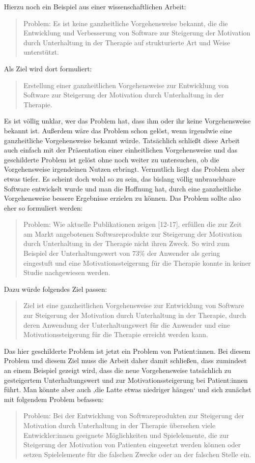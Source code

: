 Hierzu noch ein Beispiel aus einer wissenschaftlichen Arbeit:
\blockquote{Problem: Es ist keine ganzheitliche Vorgehensweise bekannt, die die Entwicklung und Verbesserung von Software zur Steigerung der Motivation durch Unterhaltung in der Therapie auf strukturierte Art und Weise unterstützt.}
Als Ziel wird dort formuliert:
\blockquote{Erstellung einer ganzheitlichen Vorgehensweise zur Entwicklung von Software zur Steigerung der Motivation durch Unterhaltung in der Therapie.}
Es ist völlig unklar, wer das Problem hat, dass ihm oder ihr keine Vorgehensweise bekannt ist.
Außerdem wäre das Problem schon gelöst, wenn irgendwie eine ganzheitliche Vorgehensweise bekannt würde.
Tatsächlich schließt diese Arbeit auch einfach mit der Präsentation einer einheitlichen Vorgehensweise und das geschilderte Problem ist gelöst ohne noch weiter zu untersuchen, ob die Vorgehensweise irgendeinen Nutzen erbringt.
Vermutlich liegt das Problem aber etwas tiefer.
Es scheint doch wohl so zu sein, das bislang völlig unbrauchbare Software entwickelt wurde und man die Hoffnung hat, durch eine ganzheitliche Vorgehensweise bessere Ergebnisse erzielen zu können.
Das Problem sollte also eher so formuliert werden:
\blockquote{Problem: Wie aktuelle Publikationen zeigen [12-17], erfüllen die zur Zeit am Markt angebotenen  Softwareprodukte zur Steigerung der Motivation durch Unterhaltung in der Therapie nicht ihren Zweck.
So wird zum Beispiel der Unterhaltungswert von 73\% der Anwender als gering eingestuft und eine Motivationssteigerung für die Therapie konnte in keiner Studie nachgewiesen werden.}
Dazu würde folgendes Ziel passen:
\blockquote{Ziel ist eine ganzheitlichen Vorgehensweise zur Entwicklung von Software zur Steigerung der Motivation durch Unterhaltung in der Therapie, durch deren Anwendung der Unterhaltungswert für die Anwender und eine Motivationssteigerung für die Therapie erreicht werden kann.}
Das hier geschilderte Problem ist jetzt ein Problem von Patient:innen.
Bei diesem Problem und diesem Ziel muss die Arbeit daher damit schließen, dass zumindest an einem Beispiel gezeigt wird, dass die neue Vorgehensweise tatsächlich zu gesteigertem Unterhaltungswert und zur Motivationssteigerung bei Patient:innen führt.
Man könnte aber auch ‚die Latte etwas niedriger hängen‘ und sich zunächst mit folgendem Problem befassen:
\blockquote{Problem: Bei der Entwicklung von Softwareprodukten zur Steigerung der Motivation durch Unterhaltung in der Therapie übersehen viele Entwickler:innen geeignete Möglichkeiten und Spielelemente, die zur Steigerung der Motivation von Patienten eingesetzt werden können oder setzen Spielelemente für die falschen Zwecke oder an der falschen Stelle ein.}
